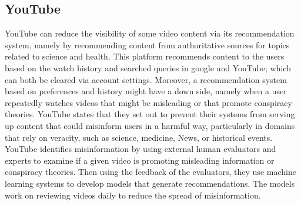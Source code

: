\documentclass{article}
\begin{document}

\subsection{YouTube}


YouTube can reduce the visibility of some video content via its recommendation system, namely by recommending content from authoritative sources for topics related to science and health. This platform recommends content to the users based on the watch history and searched queries in google and YouTube; which can both be cleared via account settings. Moreover, a recommendation system based on preferences and history might have a down side, namely when a user repeatedly watches videos that might be misleading or that promote conspiracy theories. YouTube states that they set out to prevent their systems from serving up content that could misinform users in a harmful way, particularly in domains that rely on veracity, such as science, medicine, News, or historical events.  YouTube identifies misinformation by using external human evaluators and experts to examine if a given video is promoting misleading information or conspiracy theories. Then using the feedback of the evaluators, they use machine learning systems to develop models that generate recommendations. The models work on reviewing videos daily to reduce the spread of misinformation. 

\smallskip
\end{document}
